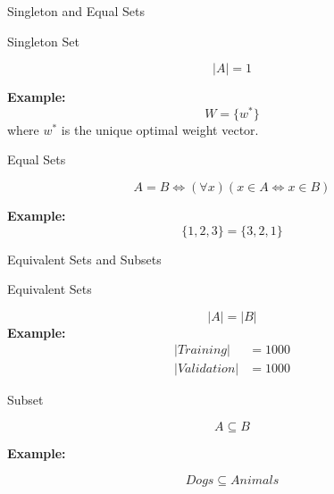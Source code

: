 \begin{frame}{Singleton and Equal Sets}

\begin{block}{Singleton Set}

\[
|A|=1
\]

\textbf{Example:}
\[
W=\{w^\ast\}
\]
where \(w^\ast\) is the unique optimal weight vector.

\end{block}

\vspace{0.1cm}

\begin{block}{Equal Sets}

\[
A=B
\iff
(\forall x)(x\in A\Leftrightarrow x\in B)
\]

\textbf{Example:}
\[
\{1,2,3\}=\{3,2,1\}
\]

\end{block}

\end{frame}

\begin{frame}{Equivalent Sets and Subsets}

\begin{block}{Equivalent Sets}

\[
|A|=|B|
\]
\textbf{Example:}
\[
\begin{aligned}
|Training| &=1000\\
|Validation| &=1000
\end{aligned}
\]

\end{block}

\vspace{0.1cm}

\begin{block}{Subset}

\[
A\subseteq B
\]

\textbf{Example:}

\[
Dogs\subseteq Animals
\]

\end{block}

\end{frame}

